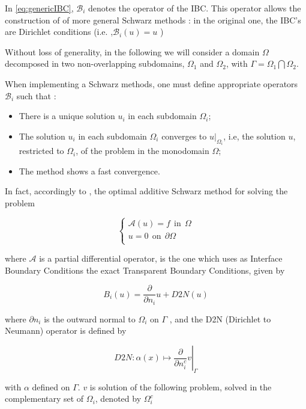 \indent In \ref{eq:genericIBC}, $\mathcal{B}_i$ denotes the operator of the IBC. This operator allows the construction of of more general Schwarz methods : in the original one, the IBC's are Dirichlet conditions (i.e. ,$\mathcal{B}_i(u) = u$  ) \cite{Japhet2003,Lions1990}

\indent Without loss of generality, in the following we will consider a domain $\Omega$ decomposed in two non-overlapping subdomains, $\Omega_1$ and $\Omega_2$, with $\Gamma = \Omega_1 \bigcap \Omega_2$.

\indent When implementing a Schwarz methods, one must define appropriate operators $\mathcal{B}_i$ such that :

\begin{itemize}
\begingroup \color{red} \item There is a unique solution $u_i$ in each subdomain $\Omega_i$; \endgroup
\item The solution $u_i$ in each subdomain $\Omega_i$ converges to $u|_{\Omega_i}$, i.e, the solution $u$, restricted to $\Omega_i$, of the problem in the monodomain $\Omega$;
\item The method shows a fast convergence.
\end{itemize} 

\indent In fact, accordingly to \cite{Japhet2003}, the optimal additive Schwarz method for solving the problem 

\begin{equation*}
\begin{cases}
\mathcal{A}(u) = f \ \ \text{in} \ \ \Omega\\
u = 0 \ \ \text{on} \ \ \partial\Omega\\
\end{cases}
\end{equation*}

\noindent where $\mathcal{A}$ is a partial differential operator, is the one which uses as Interface Boundary Conditions the exact Transparent Boundary Conditions, given by

$$B_i(u) = \frac{\partial}{\partial n_i}u + D2N(u)$$

\noindent where $\partial n_i$ is the outward normal to $\Omega_i$ on $\Gamma$ , and the D2N (Dirichlet to Neumann) operator is defined by

$$\left. D2N : \alpha(x) \mapsto \frac{\partial}{\partial n_i^c}v \right\rvert_\Gamma$$

\noindent with $\alpha$ defined on $\Gamma$. $v$ is solution of the following problem, solved in the complementary set of $\Omega_i$, denoted by $\Omega_i^c$

